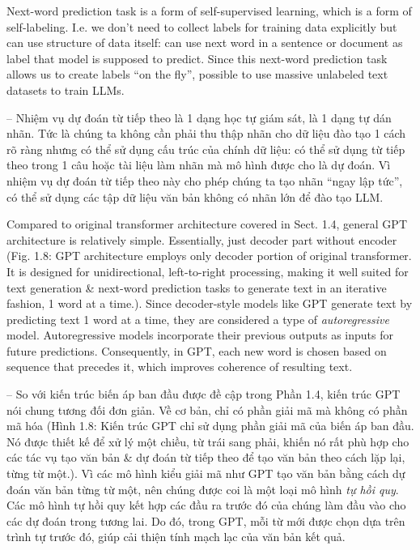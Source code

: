 \documentclass{article}
\begin{document}
\begin{itemize}
\begin{itemize}
		Next-word prediction task is a form of self-supervised learning, which is a form of self-labeling. I.e. we don't need to collect labels for training data explicitly but can use structure of data itself: can use next word in a sentence or document as label that model is supposed to predict. Since this next-word prediction task allows us to create labels ``on the fly'', possible to use massive unlabeled text datasets to train LLMs.
		
		-- Nhiệm vụ dự đoán từ tiếp theo là 1  dạng học tự giám sát, là 1  dạng tự dán nhãn. Tức là chúng ta không cần phải thu thập nhãn cho dữ liệu đào tạo 1  cách rõ ràng nhưng có thể sử dụng cấu trúc của chính dữ liệu: có thể sử dụng từ tiếp theo trong 1  câu hoặc tài liệu làm nhãn mà mô hình được cho là dự đoán. Vì nhiệm vụ dự đoán từ tiếp theo này cho phép chúng ta tạo nhãn ``ngay lập tức'', có thể sử dụng các tập dữ liệu văn bản không có nhãn lớn để đào tạo LLM.
		
		Compared to original transformer architecture covered in Sect. 1.4, general GPT architecture is relatively simple. Essentially, just decoder part without encoder ({\sf Fig. 1.8: GPT architecture employs only decoder portion of original transformer. It is designed for unidirectional, left-to-right processing, making it well suited for text generation \& next-word prediction tasks to generate text in an iterative fashion, 1 word at a time.}). Since decoder-style models like GPT generate text by predicting text 1 word at a time, they are considered a type of {\it autoregressive} model. Autoregressive models incorporate their previous outputs as inputs for future predictions. Consequently, in GPT, each new word is chosen based on sequence that precedes it, which improves coherence of resulting text.
		
		-- So với kiến trúc biến áp ban đầu được đề cập trong Phần 1.4, kiến trúc GPT nói chung tương đối đơn giản. Về cơ bản, chỉ có phần giải mã mà không có phần mã hóa ({\sf Hình 1.8: Kiến trúc GPT chỉ sử dụng phần giải mã của biến áp ban đầu. Nó được thiết kế để xử lý một chiều, từ trái sang phải, khiến nó rất phù hợp cho các tác vụ tạo văn bản \& dự đoán từ tiếp theo để tạo văn bản theo cách lặp lại, từng từ một.}). Vì các mô hình kiểu giải mã như GPT tạo văn bản bằng cách dự đoán văn bản từng từ một, nên chúng được coi là một loại mô hình {\it tự hồi quy}. Các mô hình tự hồi quy kết hợp các đầu ra trước đó của chúng làm đầu vào cho các dự đoán trong tương lai. Do đó, trong GPT, mỗi từ mới được chọn dựa trên trình tự trước đó, giúp cải thiện tính mạch lạc của văn bản kết quả.
		

\end{itemize}
\end{itemize}
\end{document}
